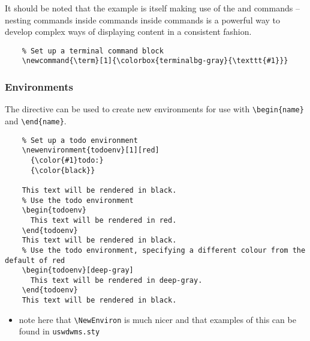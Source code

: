 It should be noted that the example is itself making use of the  and  commands -- nesting commands inside commands inside commands is a powerful way to develop complex ways of displaying content in a consistent fashion.

\begin{listing}[H]
  \captionsetup{skip=\skiplistingcaptionlen}
  \begin{verbatim}
    % Set up a terminal command block
    \newcommand{\term}[1]{\colorbox{terminalbg-gray}{\texttt{#1}}}
  \end{verbatim}
  \caption{\texttt{\textbackslash newcommand} command example}
  \label{primer:lst:basic_syntax:newcommand}
\end{listing}

\subsubsection{Environments}
The  directive can be used to create new environments for use with \texttt{\textbackslash begin\{name\}} and \texttt{\textbackslash end\{name\}}.

\begin{listing}[H]
  \captionsetup{skip=\skiplistingcaptionlen}
  \begin{verbatim}
    % Set up a todo environment
    \newenvironment{todoenv}[1][red]
      {\color{#1}todo:}
      {\color{black}}

    This text will be rendered in black.
    % Use the todo environment
    \begin{todoenv}
      This text will be rendered in red.
    \end{todoenv}
    This text will be rendered in black.
    % Use the todo environment, specifying a different colour from the default of red
    \begin{todoenv}[deep-gray]
      This text will be rendered in deep-gray.
    \end{todoenv}
    This text will be rendered in black.
  \end{verbatim}
  \caption{\texttt{\textbackslash newenvironment} command example}
  \label{primer:lst:basic_syntax:newenvironment}
\end{listing}

\noindent\begin{todoenv}
  \begin{itemize}
    \item note here that \texttt{\textbackslash NewEnviron} is much nicer and that examples of this can be found in \texttt{uswdwms.sty}
  \end{itemize}
\end{todoenv}

